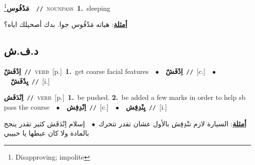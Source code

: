 \documentclass[10pt,a4paper,twoside]{article} %
\begin{document}
\begin{multicols}{2}
{\setlength\topsep{0pt}\textbf{\foreignlanguage{arabic}{مَدْفُوس}}\footnote{Disapproving; impolite}\ \ {\color{gray}\texttt{//}\color{black}}\ \textsc{noun\textunderscore pass}\ \textbf{1.}~sleeping\  \begin{flushright}\color{gray}\foreignlanguage{arabic}{\textbf{\underline{\foreignlanguage{arabic}{أمثلة}}}: هياته مَدْفُوس جوا. بدك أصحيلك اياه؟}\end{flushright}\color{black}} \vspace{2mm}

\vspace{-3mm}
\subsection*{\color{blue}\foreignlanguage{arabic}{د.ف.ش}\color{blue}{}} 

{\setlength\topsep{0pt}\textbf{\foreignlanguage{arabic}{اِدْفَشّ}}\ {\color{gray}\texttt{//}\color{black}}\ \textsc{verb}\ [p.]\ \textbf{1.}~get coarse facial features\ \ $\bullet$\ \ \setlength\topsep{0pt}\textbf{\foreignlanguage{arabic}{اِدْفَشّ}}\ {\color{gray}\texttt{//}\color{black}}\ [c.]\ \ $\bullet$\ \ \setlength\topsep{0pt}\textbf{\foreignlanguage{arabic}{يِدْفَشّ}}\ {\color{gray}\texttt{//}\color{black}}\ [i.]\ } \vspace{2mm}

{\setlength\topsep{0pt}\textbf{\foreignlanguage{arabic}{اِنْدَفَش}}\ {\color{gray}\texttt{//}\color{black}}\ \textsc{verb}\ [p.]\ \textbf{1.}~be pushed.  \textbf{2.}~be added a few marks in order to help sb pass the course\ \ $\bullet$\ \ \setlength\topsep{0pt}\textbf{\foreignlanguage{arabic}{اِنْدِفِش}}\ {\color{gray}\texttt{//}\color{black}}\ [c.]\ \ $\bullet$\ \ \setlength\topsep{0pt}\textbf{\foreignlanguage{arabic}{يِنْدِفِش}}\ {\color{gray}\texttt{//}\color{black}}\ [i.]\  \begin{flushright}\color{gray}\foreignlanguage{arabic}{\textbf{\underline{\foreignlanguage{arabic}{أمثلة}}}: السيارة لازم تنْدِفِش بالأول عشان تقدر تتحرك\ $\bullet$\ \  إسلام اِنْدَفَش كثير تقدر ينجح بالمادة ولا كان عبطها يا حبيبي}\end{flushright}\color{black}} \vspace{2mm}


\end{multicols}
\end{document}
